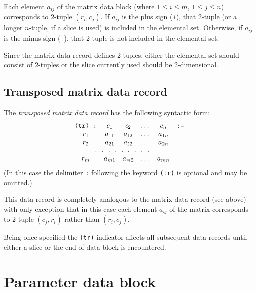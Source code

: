 \documentclass[11pt]{report}
\begin{document}
Each element $a_{ij}$ of the matrix data block (where $1\leq i\leq m$,
$1\leq j\leq n$) corresponds to 2-tuple $(r_i,c_j)$. If $a_{ij}$ is the
plus sign ({\tt+}), that 2-tuple (or a longer $n$-tuple, if a slice is
used) is included in the elemental set. Otherwise, if $a_{ij}$ is the
minus sign ({\tt-}), that 2-tuple is not included in the elemental set.

Since the matrix data record defines 2-tuples, either the elemental set
should consist of 2-tuples or the slice currently used should be
2-dimensional.

\newpage

\subsection{Transposed matrix data record}

The {\it transposed matrix data record} has the following syntactic
form:
$$\begin{array}{cccccc}
\mbox{{\tt(tr) :}}&c_1&c_2&\dots&c_n&\mbox{{\tt:=}}\\
r_1&a_{11}&a_{12}&\dots&a_{1n}&\\
r_2&a_{21}&a_{22}&\dots&a_{2n}&\\
\multicolumn{5}{c}{.\ \ .\ \ .\ \ .\ \ .\ \ .\ \ .\ \ .\ \ .}&\\
r_m&a_{m1}&a_{m2}&\dots&a_{mn}&\\
\end{array}$$
(In this case the delimiter {\tt:} following the keyword {\tt(tr)} is
optional and may be omitted.)

This data record is completely analogous to the matrix data record (see
above) with only exception that in this case each element $a_{ij}$ of
the matrix corresponds to 2-tuple $(c_j,r_i)$ rather than $(r_i,c_j)$.

Being once specified the {\tt(tr)} indicator affects all subsequent
data records until either a slice or the end of data block is
encountered.

\section{Parameter data block}

\noindent
{}
\end{document}
